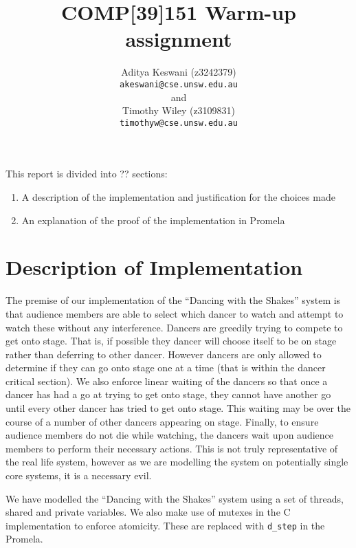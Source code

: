 \documentclass[12pt,a4paper]{scrartcl}
\begin{document}
\title{COMP[39]151 Warm-up assignment}
\author{Aditya Keswani (z3242379) \\ 
        \texttt{akeswani@cse.unsw.edu.au} \\ 
        and \\ 
        Timothy Wiley (z3109831) \\
        \texttt{timothyw@cse.unsw.edu.au} }

\maketitle

This report is divided into ?? sections:
\begin{enumerate}
    \item A description of the implementation and justification for the choices made
    \item An explanation of the proof of the implementation in Promela
\end{enumerate}

\section{Description of Implementation}
The premise of our implementation of the ``Dancing with the Shakes'' system is that audience members are able to select which dancer to watch and attempt to watch these without any interference.
Dancers are greedily trying to compete to get onto stage.
That is, if possible they dancer will choose itself to be on stage rather than deferring to other dancer.
However dancers are only allowed to determine if they can go onto stage one at a time (that is within the dancer critical section).
We also enforce linear waiting of the dancers so that once a dancer has had a go at trying to get onto stage, they cannot have another go until every other dancer has tried to get onto stage.
This waiting may be over the course of a number of other dancers appearing on stage.
Finally, to ensure audience members do not die while watching, the dancers wait upon audience members to perform their necessary actions.
This is not truly representative of the real life system, however as we are modelling the system on potentially single core systems, it is a necessary evil.

We have modelled the ``Dancing with the Shakes'' system using a set of threads, shared and private variables.
We also make use of mutexes in the C implementation to enforce atomicity.
These are replaced with \texttt{d\_step} in the Promela.
\end{document}
